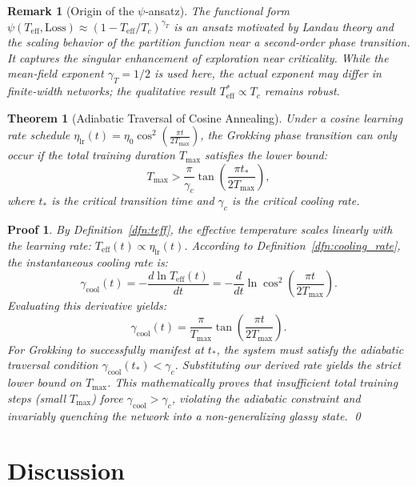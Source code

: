 \documentclass[11pt, a4paper]{article}
\newtheorem{theo}{Theorem}[section]
\theoremstyle{plain}
\newtheorem*{remark}{Remark}
\newtheorem*{pf}{Proof}
\begin{document}
\begin{remark}[Origin of the $\psi$‑ansatz]
The functional form $\psi(T_{\text{eff}}, \text{Loss}) \approx (1 - T_{\text{eff}}/T_c)^{\gamma_T}$ is an ansatz motivated by Landau theory and the scaling behavior of the partition function near a second‑order phase transition. It captures the singular enhancement of exploration near criticality. While the mean‑field exponent $\gamma_T = 1/2$ is used here, the actual exponent may differ in finite‑width networks; the qualitative result $T_{\text{eff}}^* \propto T_c$ remains robust.
\end{remark}

\begin{theo}[Adiabatic Traversal of Cosine Annealing]\label{theo:cosine_annealing}
Under a cosine learning rate schedule $\eta_{\text{lr}}(t) = \eta_0 \cos^2\left(\frac{\pi t}{2 T_{\max}}\right)$, the Grokking phase transition can only occur if the total training duration $T_{\max}$ satisfies the lower bound:
\begin{equation}
T_{\max} > \frac{\pi}{\gamma_c} \tan\left(\frac{\pi t_*}{2 T_{\max}}\right),
\end{equation}
where $t_*$ is the critical transition time and $\gamma_c$ is the critical cooling rate.
\end{theo}

\begin{pf}
By Definition~\ref{dfn:teff}, the effective temperature scales linearly with the learning rate: $T_{\text{eff}}(t) \propto \eta_{\text{lr}}(t)$. According to Definition~\ref{dfn:cooling_rate}, the instantaneous cooling rate is:
\[
\gamma_{\text{cool}}(t) = -\frac{d \ln T_{\text{eff}}(t)}{dt} = -\frac{d}{dt} \ln \cos^2\left(\frac{\pi t}{2 T_{\max}}\right).
\]
Evaluating this derivative yields:
\[
\gamma_{\text{cool}}(t) = \frac{\pi}{T_{\max}} \tan\left(\frac{\pi t}{2 T_{\max}}\right).
\]
For Grokking to successfully manifest at $t_*$, the system must satisfy the adiabatic traversal condition $\gamma_{\text{cool}}(t_*) < \gamma_c$. Substituting our derived rate yields the strict lower bound on $T_{\max}$. This mathematically proves that insufficient total training steps (small $T_{\max}$) force $\gamma_{\text{cool}} > \gamma_c$, violating the adiabatic constraint and invariably quenching the network into a non-generalizing glassy state.
\qed
\end{pf}

\section{Discussion}
\end{document}
